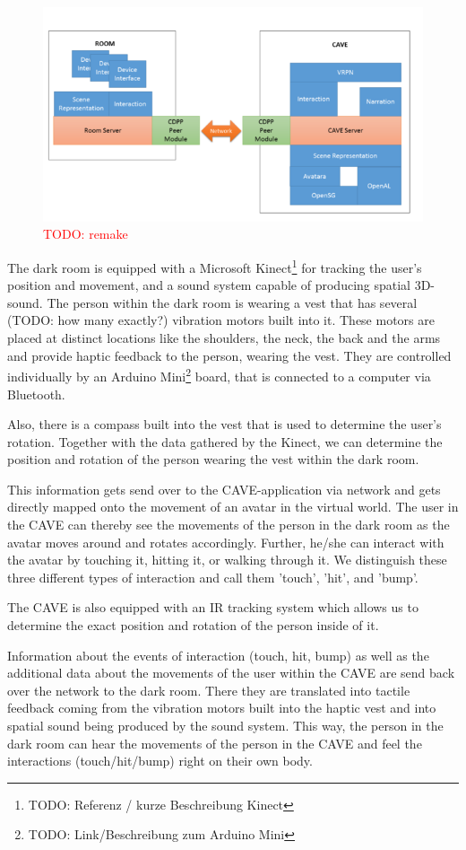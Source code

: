\documentclass[conference]{acmsiggraph}
\newcommand{\todo}[1]{\textcolor{red}{TODO: #1}}
\begin{document}
\begin{figure}[ht]
	\includegraphics[width=\linewidth]{images/system_architecture.png}
	\caption{\todo{remake}}
	\label{FIG:SYSTEM_ARCHITECTURE}
\end{figure}

The dark room is equipped with a Microsoft Kinect\footnote{TODO: Referenz / kurze Beschreibung Kinect} for tracking the user's position and movement, and a sound system capable of producing spatial 3D-sound. The person within the dark room is wearing a vest that has several (TODO: how many exactly?) vibration motors built into it. These motors are placed at distinct locations like the shoulders, the neck, the back and the arms and provide haptic feedback to the person, wearing the vest. They are controlled individually by an Arduino Mini\footnote{TODO: Link/Beschreibung zum Arduino Mini} board, that is connected to a computer via Bluetooth.\par
Also, there is a compass built into the vest that is used to determine the user's rotation. Together with the data gathered by the Kinect, we can determine the position and rotation of the person wearing the vest within the dark room.\par
This information gets send over to the CAVE-application via network and gets directly mapped onto the movement of an avatar in the virtual world. The user in the CAVE can thereby see the movements of the person in the dark room as the avatar moves around and rotates accordingly. Further, he/she can interact with the avatar by touching it, hitting it, or walking through it. We distinguish these three different types of interaction and call them 'touch', 'hit', and 'bump'.\par
The CAVE is also equipped with an IR tracking system which allows us to determine the exact position and rotation of the person inside of it.\par
Information about the events of interaction (touch, hit, bump) as well as the additional data about the movements of the user within the CAVE are send back over the network to the dark room. There they are translated into tactile feedback coming from the vibration motors built into the haptic vest and into spatial sound being produced by the sound system.
This way, the person in the dark room can hear the movements of the person in the CAVE and feel the interactions (touch/hit/bump) right on their own body.\par
\end{document}
